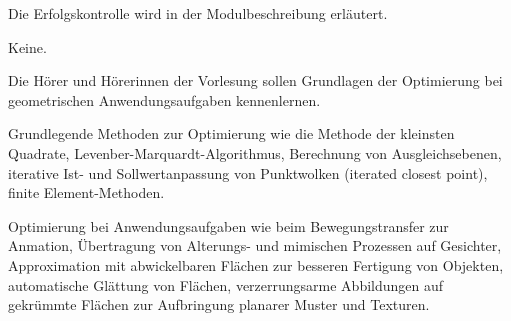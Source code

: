 \begin{course}

\setdoclanguagegerman
{}



\coursehead


\label{cour_13907.dp_997}


\begin{styleenv}
\begin{assessment}
Die Erfolgskontrolle wird in der Modulbeschreibung erläutert.


\end{assessment}

\begin{conditions}Keine.\end{conditions}


\end{styleenv}

\begin{learningoutcomes}
Die Hörer und Hörerinnen der Vorlesung sollen Grundlagen der Optimierung bei geometrischen Anwendungsaufgaben kennenlernen.


\end{learningoutcomes}

\begin{content}
Grundlegende Methoden zur Optimierung wie die Methode der kleinsten Quadrate, Levenber-Marquardt-Algorithmus, Berechnung von Ausgleichsebenen, iterative Ist- und Sollwertanpassung von Punktwolken (iterated closest point), finite Element-Methoden.

 

Optimierung bei Anwendungsaufgaben wie beim Bewegungstransfer zur Anmation, Übertragung von Alterungs- und mimischen Prozessen auf Gesichter, Approximation mit abwickelbaren Flächen zur besseren Fertigung von Objekten, automatische Glättung von Flächen, verzerrungsarme Abbildungen auf gekrümmte Flächen zur Aufbringung planarer Muster und Texturen.


\end{content}
\end{course}
